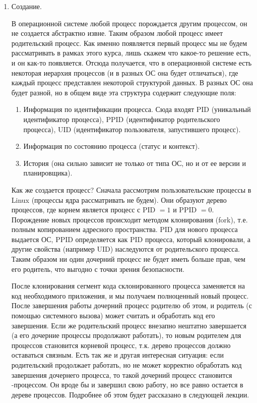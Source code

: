 
\begin{enumerate}
\item
  Создание.
  
  В операционной системе любой процесс порождается другим процессом, он не
  создается абстрактно извне. Таким образом любой процесс имеет родительский
  процесс. Как именно появляется первый процесс мы не будем рассматривать в
  рамках этого курса, лишь скажем что какое-то решение есть, и он как-то
  появляется. Отсюда получается, что в операционной системе есть некоторая
  иерархия процессов (и в разных ОС она будет отличаться), где каждый процесс
  представлен некоторой структурой данных. В разных ОС она будет разной, но в
  общем виде эта структура содержит следующие поля:
  
  \begin{enumerate}
  \item
    Информация по идентификации процесса. Сюда входят PID (уникальный
    идентификатор процесса), PPID (идентификатор родительского процесса), UID
    (идентификатор пользователя, запустившего процесс).
    
  \item
    Информация по состоянию процесса (статус и контекст).
    
  \item
    История (она сильно зависит не только от типа ОС, но и от ее версии и
    планировщика).
  \end{enumerate}
  
  Как же создается процесс? Сначала рассмотрим пользовательские процессы в Linux
  (процессы ядра рассматривать не будем). Они образуют дерево процессов, где
  корнем является процесс с PID \(= 1\) и PPID \(= 0\). Порождение новых
  процессов происходит методом клонирования (fork), т.е. полным копированием
  адресного пространства. PID для нового процесса выдается ОС, PPID определяется
  как PID процесса, который клонировали, а другие свойства (например UID)
  наследуются от родительского процесса. Таким образом ни один дочерний процесс
  не будет иметь больше прав, чем его родитель, что выгодно с точки зрения
  безопасности.

  После клонирования сегмент кода склонированного процесса заменяется на код
  необходимого приложения, и мы получаем полноценный новый процесс. После
  завершения работы дочерний процесс  родителю об этом, и
  родитель (с помощью системного вызова) может считать и обработать код его
  завершения. Если же родительский процесс внезапно нештатно завершается (а его
  дочерние процессы продолжают работать), то новым родителем для
   процессов становится корневой процесс, т.к. дерево
  процессов должно оставаться связным. Есть так же и другая интересная ситуация:
  если родительский продолжает работать, но не может корректно обработать код
  завершения дочернего процесса, то такой дочерний процесс становится
  -процессом. Он вроде бы и завершил свою работу, но все равно
  остается в дереве процессов. Подробнее об этом будет рассказано в следующей
  лекции.


\end{enumerate}
